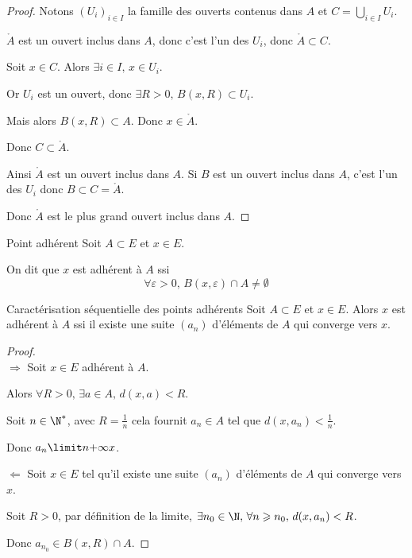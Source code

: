 \begin{proof}
    Notons $(U_i)_{i \in I}$ la famille des ouverts contenus dans $A$
    et $C = \bigcup_{i \in I} U_i$.

    $\mathring A$ est un ouvert inclus dans $A$, donc c'est l'un des $U_i$, donc $\mathring A \subset C$.

    Soit $x \in C$. Alors $\exists i \in I, \, x \in U_i$.

    Or $U_i$ est un ouvert, donc $\exists R > 0, \, B(x, R) \subset U_i$. 

    Mais alors $B(x, R) \subset A$. Donc $x \in \mathring A$.

    Donc $C \subset \mathring A$.

    Ainsi $\mathring A$ est un ouvert inclus dans $A$. Si $B$ est un ouvert inclus dans 
    $A$, c'est l'un des $U_i$ donc $B \subset C = \mathring A$.

    Donc $\mathring A$ est le plus grand ouvert inclus dans $A$.
\end{proof}

\begin{definition}{Point adhérent}{}
    Soit $A \subset E$ et $x \in E$.

    On dit que $x$ est adhérent à $A$ ssi 
    \[\forall \varepsilon > 0, \, B(x, \varepsilon) \cap A \neq \emptyset\]
\end{definition}

\begin{theoreme}{Caractérisation séquentielle des points adhérents}{}
    Soit $A \subset E$ et $x \in E$.
    Alors $x$ est adhérent à $A$ ssi il existe une suite $(a_n)$ d'éléments de $A$ 
    qui converge vers $x$.
\end{theoreme}

\begin{proof}~\\
    $\Rightarrow$ Soit $x \in E$ adhérent à $A$. 

    Alors $\forall R > 0, \, \exists a \in A, \, d(x, a) < R$.

    Soit $n \in \N^*$, avec $R = \frac 1 n$ cela fournit $a_n \in A$ tel que $d(x, a_n) < \frac 1 n$.

    Donc $a_n \limit n {+ \infty} x$.

    $\Leftarrow$ Soit $x \in E$ tel qu'il existe une suite $(a_n)$ d'éléments 
    de $A$ qui converge vers $x$. 

    Soit $R > 0$, par définition de la limite, $\exists n_0 \in \N, \, \forall n \geqslant n_0, \, d(x, a_n) < R$.

    Donc $a_{n_0} \in B(x, R) \cap A$. 
\end{proof}

